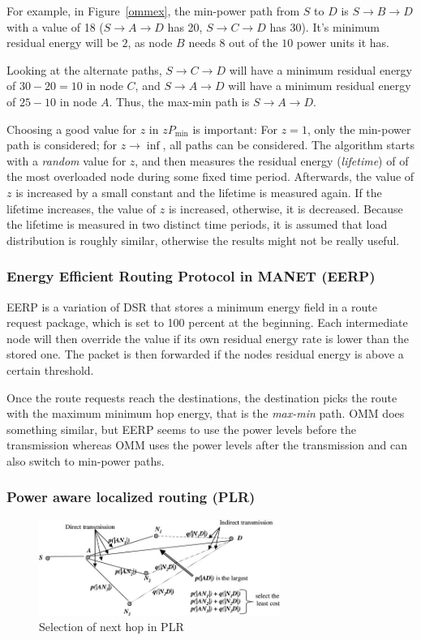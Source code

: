 For example, in Figure~\ref{ommex}, the min-power path from
$S$ to $D$ is $S \to B \to D$ with a value of 18 ($S \to A \to D$ has 20,
$S \to C \to D$ has 30).
It's minimum residual energy will be $2$, as node $B$ needs
$8$ out of the $10$ power units it has.

Looking at the alternate paths, $S \to C \to D$ will have a
minimum residual energy of $30-20=10$ in node $C$, and $S \to A \to D$ will
have a minimum residual energy of $25-10$ in node $A$.
Thus, the max-min path is $S \to A \to D$.

Choosing a good value for $z$ in $zP_{\min}$ is important: For $z=1$, only
the min-power path is considered; for $z \to \inf$, all paths can be
considered. The algorithm starts with a \textit{random} value for $z$, and
then measures the residual energy (\textit{lifetime}) of of the most overloaded node during some
fixed time period. Afterwards, the value of $z$ is increased by a small constant
and the lifetime is measured again. If the lifetime increases, the value of $z$
is increased, otherwise, it is decreased. Because the lifetime is measured
in two distinct time periods, it is assumed that load distribution is roughly
similar, otherwise the results might not be really useful.


\subsubsection{Energy Efficient Routing Protocol in MANET (EERP)}
EERP\cite{main2} is a variation of DSR that stores a minimum energy field
in a route request package, which is set to 100 percent at the beginning. Each
intermediate node will then override the value if its own residual energy rate
is lower than the stored one. The packet is then forwarded if the nodes residual
energy is above a certain threshold.

Once the route requests reach the destinations, the destination picks the route
with the maximum minimum hop energy, that is the \textit{max-min} path. OMM
does something similar, but EERP seems to use the power
levels before the transmission whereas OMM uses the power levels after the
transmission and can also switch to min-power paths.

\subsubsection{Power aware localized routing (PLR)}
\begin{figure}
\centering
\includegraphics[width=0.7\textwidth]{images/plr-example}
\caption{Selection of next hop in PLR\cite{alotaibi2012survey}}
\label{plrexample}
\end{figure}

